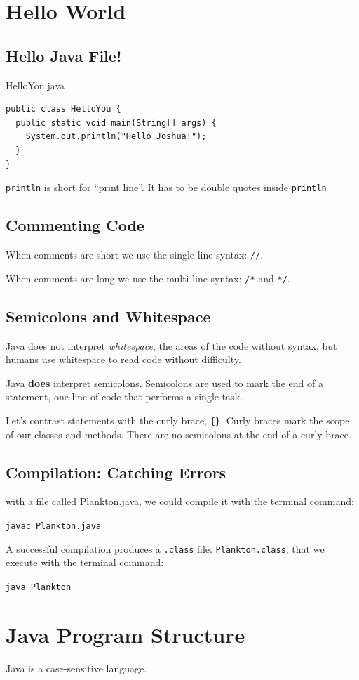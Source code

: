 \documentclass[a4paper, 12pt]{article}
\begin{document}
\section{Hello World}
\subsection{Hello Java File!}
HelloYou.java

\begin{verbatim}
public class HelloYou {
  public static void main(String[] args) {
    System.out.println("Hello Joshua!");
  }
}
\end{verbatim}
\verb|println| is short for ``print line''. It has to be double quotes inside \verb|println|

\subsection{Commenting Code}
When comments are short we use the single-line syntax: \verb|//|.

When comments are long we use the multi-line syntax: \verb|/*| and \verb|*/|.

\subsection{Semicolons and Whitespace}
Java does not interpret \textit{whitespace}, the areas of the code without syntax, but humans use whitespace to read code without difficulty.

Java \textbf{does} interpret semicolons. Semicolons are used to mark the end of a statement, one line of code that performs a single task.

Let's contrast statements with the curly brace, \verb|{}|. Curly braces mark the scope of our classes and methods. There are no semicolons at the end of a curly brace.

\subsection{Compilation: Catching Errors}
with a file called Plankton.java, we could compile it with the terminal command:

\verb|javac Plankton.java|

A successful compilation produces a \verb|.class| file: \verb|Plankton.class|, that we execute with the terminal command:

\verb|java Plankton|


\section{Java Program Structure}
Java is a case-sensitive language.
\end{document}
